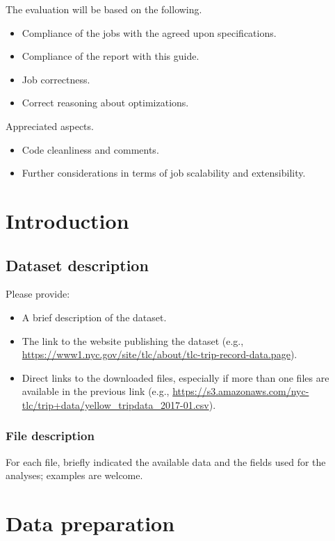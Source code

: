 \documentclass[10pt]{article}
\begin{document}
The evaluation will be based on the following.
\begin{itemize}
\item Compliance of the jobs with the agreed upon specifications.
\item Compliance of the report with this guide.
\item Job correctness.
\item Correct reasoning about optimizations.
\end{itemize}

Appreciated aspects.
\begin{itemize}
\item Code cleanliness and comments.
\item Further considerations in terms of job scalability and extensibility.
\end{itemize}



\section{Introduction}
\subsection{Dataset description}

Please provide:
\begin{itemize}
\item A brief description of the dataset.
\item The link to the website publishing the dataset (e.g., \url{https://www1.nyc.gov/site/tlc/about/tlc-trip-record-data.page}).
\item Direct links to the downloaded files, especially if more than one files are available in the previous link (e.g., \url{https://s3.amazonaws.com/nyc-tlc/trip+data/yellow_tripdata_2017-01.csv}).
\end{itemize}

\subsubsection{File description}

For each file, briefly indicated the available data and the fields used for the analyses; examples are welcome.


\section{Data preparation}
\end{document}
